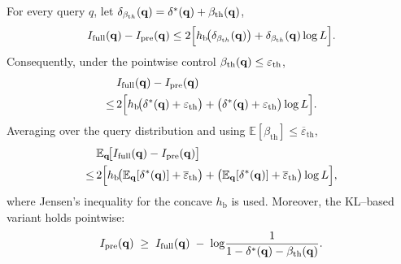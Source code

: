 \begin{theorem}
\label{thm:prehoc-error}
For every query $q$, let $\delta_{\beta_{\mathrm th}}(\mathbf{q})=\delta^{*}(\mathbf{q})+\beta_{\mathrm{th}}(\mathbf{q})$,
\begin{align}
    I_{\mathrm{full}}(\mathbf{q})-I_{\mathrm{pre}}(\mathbf{q}) \le 2\Big[h_{\mathrm b}\!\big(\delta_{\beta_{\mathrm th}}(\mathbf{q})\big)+\delta_{\beta_{\mathrm th}}(\mathbf{q})\log L \Big].
\label{eq:prehoc-pointwise}
\end{align}
Consequently, under the pointwise control $\beta_{\mathrm{th}}(\mathbf{q})\le \varepsilon_{\mathrm{th}}$,
\begin{align}
&I_{\mathrm{full}}(\mathbf{q})-I_{\mathrm{pre}}(\mathbf{q}) \nonumber \\
\le \,
&2\Big[
h_{\mathrm b}\!\big(\delta^{*}(\mathbf{q})+\varepsilon_{\mathrm{th}}\big)
+\big(\delta^{*}(\mathbf{q})+\varepsilon_{\mathrm{th}}\big)\log L
\Big].
\label{eq:prehoc-uniform}
\end{align}
Averaging over the query distribution and using $\mathbb E[\beta_{\mathrm{th}}]\le \overline\varepsilon_{\mathrm{th}}$,
\begin{align}
&\mathbb E_{\mathbf{q}}\!\big[I_{\mathrm{full}}(\mathbf{q})-I_{\mathrm{pre}}(\mathbf{q})\big] \nonumber \\
\le \,
&2\Big[
h_{\mathrm b}\!\big(\mathbb E_{\mathbf{q}}[\delta^{*}(\mathbf{q})]+\overline\varepsilon_{\mathrm{th}}\big)
+\big(\mathbb E_{\mathbf{q}}[\delta^{*}(\mathbf{q})]+\overline\varepsilon_{\mathrm{th}}\big)\log L
\Big],
\label{eq:prehoc-expected}
\end{align}
where Jensen's inequality for the concave $h_{\mathrm b}$ is used. Moreover, the KL--based variant holds pointwise:
\begin{equation}
I_{\mathrm{pre}}(\mathbf{q})
\;\ge\;
I_{\mathrm{full}}(\mathbf{q})\;-\;\log\!\frac{1}{1-\delta^{*}(\mathbf{q})-\beta_{\mathrm{th}}(\mathbf{q})}.
\label{eq:prehoc-KL}
\end{equation}
\end{theorem}

